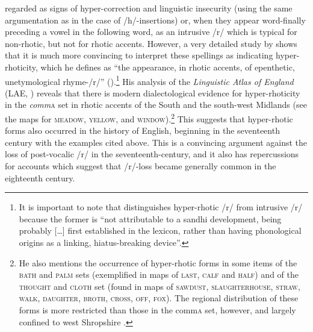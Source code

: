 regarded as signs of hyper-correction and linguistic insecurity (using the same argumentation as in the case of /h/-insertions) or, when they appear word-finally preceding a vowel in the following word, as an intrusive /r/ which is typical for non-rhotic, but not for rhotic accents. However, a very detailed study by \citet{Britton2007} shows that it is much more convincing to interpret these spellings as indicating hyper-rhoticity, which he defines as “the appearance, in rhotic accents, of epenthetic, unetymological rhyme-/r/” (\citeyear[525]{Britton2007}).\footnote{It is important to note that \citet[527]{Britton2007} distinguishes hyper-rhotic /r/ from intrusive /r/ because the former is “not attributable to a sandhi development, being probably […] first established in the lexicon, rather than having phonological origins as a linking, hiatus-breaking device”.} His analysis of the \emph{Linguistic Atlas of England} (LAE, \citealt{Orton1978}) reveals that there is modern dialectological evidence for hyper-rhoticity in the \emph{\textup{comm}}\textsc{a} set in rhotic accents of the South and the south-west Midlands (see the maps for \textsc{meadow}, \textsc{yellow}, and \textsc{window}).\footnote{He also mentions the occurrence of hyper-rhotic forms in some items of the \textsc{bath} and \textsc{palm} sets (exemplified in maps of \textsc{last}, \textsc{calf} and \textsc{half}) and of the \textsc{thought} and \textsc{cloth} set (found in maps of \textsc{sawdust}, \textsc{slaughterhouse}, \textsc{straw}, \textsc{walk}, \textsc{daughter}, \textsc{broth}, \textsc{cross}, \textsc{off}, \textsc{fox}). The regional distribution of these forms is more restricted than those in the comm\textsc{a} set, however, and largely confined to west Shropshire \citep[528]{Britton2007}.} This suggests that hyper-rhotic forms also occurred in the history of English, beginning in the seventeenth century with the examples cited above. This is a convincing argument against the loss of post-vocalic /r/ in the seventeenth-century, and it also has repercussions for accounts which suggest that /r/-loss became generally common in the eighteenth century.


